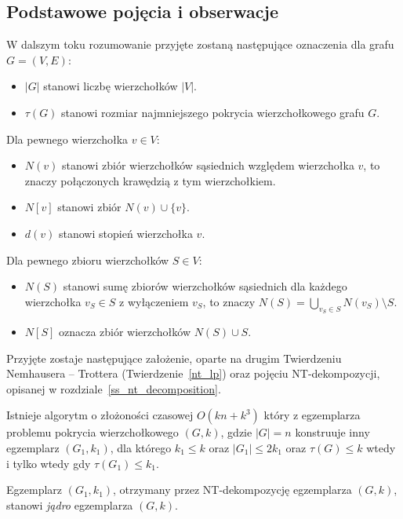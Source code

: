 \subsection{Podstawowe pojęcia i obserwacje}\label{ss_ckx_preliminaries}
\par{
  W dalszym toku rozumowanie przyjęte zostaną następujące oznaczenia dla grafu $G=(V, E)$:
  \begin{itemize}
    \item $|G|$ stanowi liczbę wierzchołków $|V|$.
    \item $\tau(G)$ stanowi rozmiar najmniejszego pokrycia wierzchołkowego grafu $G$.
  \end{itemize}
  Dla pewnego wierzchołka $v \in V$:
  \begin{itemize}
    \item $N(v)$ stanowi zbiór wierzchołków sąsiednich względem wierzchołka $v$, to znaczy połączonych krawędzią z tym wierzchołkiem.
    \item $N[v]$ stanowi zbiór $N(v) \cup \{v\}$.
    \item $d(v)$ stanowi stopień wierzchołka $v$.
  \end{itemize}
  Dla pewnego zbioru wierzchołków $S \in V$:
  \begin{itemize}
    \item $N(S)$ stanowi sumę zbiorów wierzchołków sąsiednich dla każdego wierzchołka $v_S \in S$ z wyłączeniem $v_S$, to znaczy $N(S)=\bigcup_{v_S\in S}N(v_S) \setminus S$.
    \item $N[S]$ oznacza zbiór wierzchołków $N(S) \cup S$.
  \end{itemize}

  Przyjęte zostaje następujące założenie, oparte na drugim Twierdzeniu Nemhausera -- Trottera (Twierdzenie~\ref{nt_lp}) oraz pojęciu NT-dekompozycji, opisanej w rozdziale~\ref{ss_nt_decomposition}.
  \begin{proposition}
    Istnieje algorytm o złożoności czasowej $O(kn + k^3)$ który z egzemplarza problemu pokrycia wierzchołkowego $(G, k)$, gdzie $|G|=n$ konstruuje inny egzemplarz $(G_1, k_1)$, dla którego $k_1 \leq k$ oraz $|G_1| \leq 2k_1$ oraz $\tau(G) \leq k$ wtedy i tylko wtedy gdy $\tau(G_1) \leq k_1$.
  \end{proposition}

  \begin{definition}
    Egzemplarz $(G_1, k_1)$, otrzymany przez NT-dekompozycję egzemplarza $(G, k)$, stanowi \emph{jądro} egzemplarza $(G, k)$.
  \end{definition}
}
